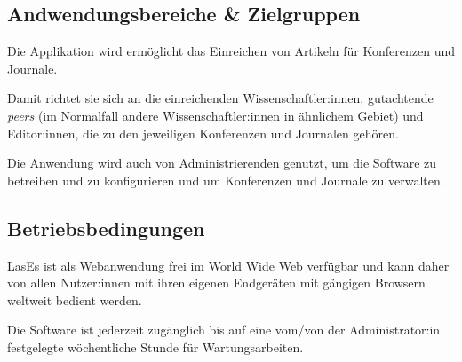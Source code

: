
\subsection{Andwendungsbereiche \& Zielgruppen}

Die Applikation wird ermöglicht das Einreichen von Artikeln für Konferenzen und Journale.

Damit richtet sie sich an die einreichenden Wissenschaftler:innen, gutachtende \emph{peers} (im Normalfall andere Wissenschaftler:innen in ähnlichem Gebiet) und Editor:innen, die zu den jeweiligen Konferenzen und Journalen gehören.

Die Anwendung wird auch von Administrierenden genutzt, um die Software zu betreiben und zu konfigurieren und um Konferenzen und Journale zu verwalten.

\subsection{Betriebsbedingungen}

LasEs ist als Webanwendung frei im World Wide Web verfügbar und kann daher von allen Nutzer:innen mit ihren eigenen Endgeräten mit gängigen Browsern weltweit bedient werden.

Die Software ist jederzeit zugänglich bis auf eine vom/von der Administrator:in festgelegte wöchentliche Stunde für Wartungsarbeiten.